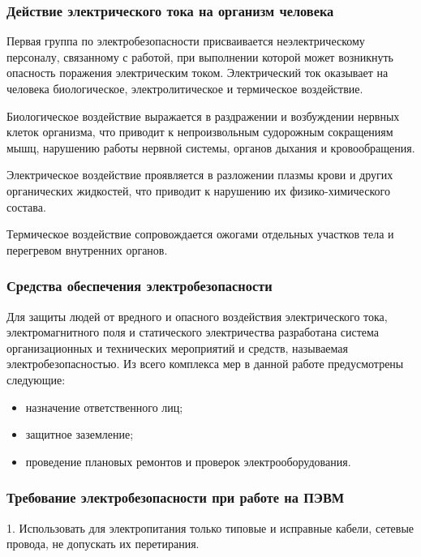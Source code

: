 \subsubsection{Действие электрического тока на организм человека}
Первая группа по электробезопасности  присваивается неэлектрическому персоналу, связанному с работой,
при выполнении которой может  возникнуть опасность поражения электрическим током.
Электрический ток оказывает на человека биологическое, электролитическое и термическое воздействие.


Биологическое воздействие выражается в раздражении и возбуждении нервных
клеток организма, что приводит к непроизвольным судорожным сокращениям мышц, нарушению
работы нервной системы, органов дыхания и кровообращения.


Электрическое воздействие проявляется в разложении плазмы крови и других
органических жидкостей, что приводит к нарушению их физико-химического
состава.


Термическое воздействие сопровождается ожогами отдельных участков
тела и перегревом внутренних органов.



\subsubsection{Средства обеспечения электробезопасности}
Для защиты людей от вредного и опасного воздействия электрического тока,
электромагнитного поля и статического электричества разработана система 
организационных и технических мероприятий и средств, называемая
электробезопасностью. Из всего комплекса мер в данной работе предусмотрены
следующие:
\begin{itemize}
	\item{} назначение ответственного лиц;
	\item{} защитное заземление;
	\item{} проведение плановых ремонтов и проверок электрооборудования.
\end{itemize}


\subsubsection{Требование электробезопасности при работе на ПЭВМ}

\begin{par}
	1.	Использовать для электропитания только типовые и исправные кабели,
   сетевые провода, не допускать их перетирания.
\end{par}

